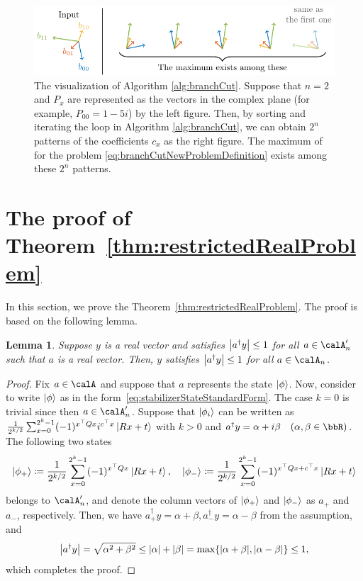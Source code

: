 \documentclass[a4paper, onecolumn, 11pt, longbibliography]{quantumarticle}
\newcommand{\defeq}{\coloneqq}
\newtheorem{lemma}{Lemma}
\begin{document}
\begin{figure}[htbp]
  \centering
  \includegraphics[width=\columnwidth]{imgs/argsort.pdf}
  \caption{
    The visualization of Algorithm \ref{alg:branchCut}.
    Suppose that $n=2$ and $P_x$ are represented as the vectors in the complex plane
    (for example, $P_{00} = 1-5i$) by the left figure.
    Then, by sorting and iterating the loop in Algorithm \ref{alg:branchCut},
    we can obtain $2^n$ patterns of the coefficients $c_x$ as the right figure.
    The maximum of for the problem \eqref{eq:branchCutNewProblemDefinition}
    exists among these $2^n$ patterns.
  }
  \label{fig:argsort}
\end{figure}

\section{The proof of Theorem~\ref{thm:restrictedRealProblem}}

In this section, we prove the Theorem~\ref{thm:restrictedRealProblem}.
The proof is based on the following lemma.
\begin{lemma}{\label{lem:absRealForTIsAbsRealForS}}
  Suppose $y$ is a real vector and satisfies
  $\abs{a^\dagger y} \leq 1$ for all $a \in \calA'_n$
  such that $a$ is a real vector.
  Then, $y$ satisfies
  $\abs{a^\dagger y} \leq 1$ for all $a \in \calA_n$.
\end{lemma}
\begin{proof}
  Fix $a \in \calA$ and suppose that $a$ represents
  the state $\ket{\phi}$.
  Now, consider to write $\ket{\phi}$ as in the form~\eqref{eq:stabilizerStateStandardForm}.
  The case $k=0$ is trivial since then $a \in \calA'_n$.
  Suppose that $\ket{\phi_i}$ can be written as
  $\frac{1}{2^{k/2}}\sum_{x=0}^{2^k-1} (-1)^{x^\top Q x} i^{c^\top x} \ket{Rx+t}$ with $k>0$
  and
  $a^\dagger y = \alpha + i\beta \quad (\alpha, \beta \in \bbR)$.
  The following two states
  \begin{equation*}
    \ket{\phi_+} \defeq \frac{1}{2^{k/2}}\sum_{x=0}^{2^k-1} (-1)^{x^\top Q x} \ket{Rx+t}, \quad
    \ket{\phi_-} \defeq \frac{1}{2^{k/2}}\sum_{x=0}^{2^k-1} (-1)^{x^\top Q x + c^\top x} \ket{Rx+t}
  \end{equation*}
  belongs to $\calA'_n$,
  and denote the column vectors of $\ket{\phi_+}$ and $\ket{\phi_-}$ as $a_+$ and $a_-$, respectively.
  Then, we have $a_+^\dagger y = \alpha+\beta, a_-^\dagger y = \alpha-\beta$
  from the assumption, and
  \begin{equation*}
    \abs{a^\dagger y}
    =\sqrt{\alpha^2 + \beta^2}
    \leq \abs{\alpha}+\abs{\beta}
    = \max\{\abs{\alpha+\beta}, \abs{\alpha-\beta}\}
    \leq 1,
  \end{equation*}
  which completes the proof.
\end{proof}
\end{document}
